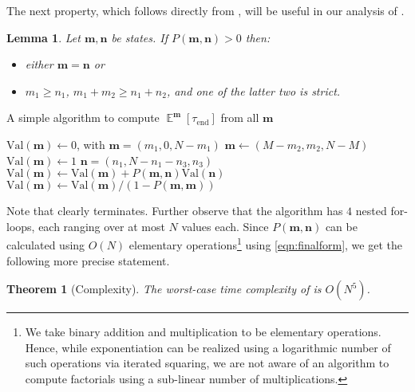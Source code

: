 \documentclass[a4paper,preprint]{elsarticle}
\newtheorem{theorem}{Theorem}
\newtheorem{lemma}{Lemma}
\newcommand{\htime}{\tau_\mathrm{end}}
\newcommand{\Val}{\mathrm{Val}}
\renewcommand{\vec}[1]{\boldsymbol{#1}}
\DeclareMathOperator{\Ex}{\mathbb{E}}
\begin{document}
The next property, which follows directly from , will be useful
in our analysis of .
\begin{lemma}\label{lem:order}
  Let $\vec{m},\vec{n}$ be states. If $P(\vec{m},\vec{n}) > 0$ then:
  \begin{itemize}
    \item either $\vec{m} = \vec{n}$ or
    \item $m_1 \geq n_1$, $m_1 + m_2 \geq n_1 + n_2$, and one of the latter
      two is strict.
  \end{itemize}
\end{lemma}

\begin{algorithm}[t]
    \caption{A simple algorithm to compute $\Ex^{\vec{m}}[\htime]$ from all $\vec{m}$}
    \label{alg:simple}
    \begin{algorithmic}[1]
       
          \State $\Val(\vec{m}) \gets 0$, with $\vec{m} = (m_1,0,N-m_1)$
      \EndFor \label{loc:endinit}
        \label{loc:M}
              \State $\vec{m} \gets (M - m_2,m_2,N-M)$ \label{loc:m}
              \State $\Val(\vec{m}) \gets 1$ \label{loc:initval}
                   \label{loc:inner}
                     \State $\vec{n} = (n_1,N-n_1-n_3,n_3)$ \label{loc:n}
                      \If{$\vec{m} \neq \vec{n}$} 
                          \State $\Val(\vec{m}) \gets \Val(\vec{m}) +
                          P(\vec{m},\vec{n})\Val(\vec{n})$ \label{loc:rec}
                      \EndIf
                  \EndFor \label{loc:endinner}
              \EndFor \label{loc:endloopsm}
              \State $\Val(\vec{m}) \gets \Val(\vec{m}) /
              (1-P(\vec{m},\vec{m}))$ 
              \label{loc:norm}
          \EndFor
      \EndFor
    \end{algorithmic}
\end{algorithm}

Note that  clearly terminates. Further observe that the
algorithm has $4$ nested for-loops, each ranging over at most $N$ values
each. Since $P(\vec{m},\vec{n})$ can be calculated using $O(N)$ elementary
operations\footnote{We take binary addition and multiplication to be
elementary operations. Hence, while exponentiation can be realized using a
logarithmic number of such operations via iterated squaring, we are not
aware of an algorithm to compute factorials using a sub-linear number of
multiplications.}
using \eqref{eqn:finalform}, we get the following more
precise statement.
\begin{theorem}[Complexity]
  The worst-case time complexity of  is
  $O(N^5)$.
\end{theorem}
\end{document}
